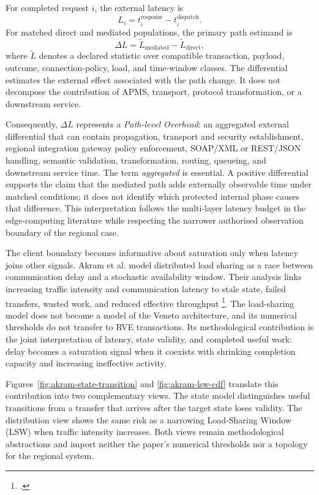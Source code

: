 For completed request $i$, the external latency is
\begin{equation}
    L_i=t^{\mathrm{response}}_i-t^{\mathrm{dispatch}}_i.
\end{equation}
For matched direct and mediated populations, the primary path estimand is
\begin{equation}
    \Delta L = \widetilde{L}_{\mathrm{mediated}}
             - \widetilde{L}_{\mathrm{direct}},
\end{equation}
where $\widetilde{L}$ denotes a declared statistic over compatible transaction,
payload, outcome, connection-policy, load, and time-window classes. The
differential estimates the external effect associated with the path change. It
does not decompose the contribution of APMS, transport, protocol transformation,
or a downstream service.

\noindent Consequently, $\Delta L$ represents a \emph{Path-level Overhead}: an aggregated
external differential that can contain propagation, transport and security
establishment, regional integration gateway policy enforcement, SOAP/XML or REST/JSON handling, semantic validation, transformation, routing, queueing, and downstream service
time. The term \emph{aggregated} is essential. A positive differential supports
the claim that the mediated path adds externally observable time under matched
conditions; it does not identify which protected internal phase causes that
difference. This interpretation follows the multi-layer latency budget in the
edge-computing literature while respecting the narrower authorised observation
boundary of the regional case.

\noindent The client boundary becomes informative about saturation only when latency joins
other signals. Akram et al. model distributed load sharing as a race
between communication delay and a stochastic availability window. Their analysis
links increasing traffic intensity and communication latency to stale state,
failed transfers, wasted work, and reduced effective throughput
\footcite{akram-numerical-latency}. The load-sharing model does not become a model
of the Veneto architecture, and its numerical thresholds do not transfer to RVE transactions. Its methodological contribution is the joint interpretation of
latency, state validity, and completed useful work: delay becomes a saturation
signal when it coexists with shrinking completion capacity and increasing
ineffective activity.

\noindent Figures~\ref{fig:akram-state-transition} and
\ref{fig:akram-lsw-cdf} translate this contribution into two complementary
views. The state model distinguishes useful transitions from a transfer that
arrives after the target state loses validity. The distribution view shows the
same risk as a narrowing Load-Sharing Window (LSW) when traffic intensity
increases. Both views remain methodological abstractions and import neither the
paper's numerical thresholds nor a topology for the regional system.

